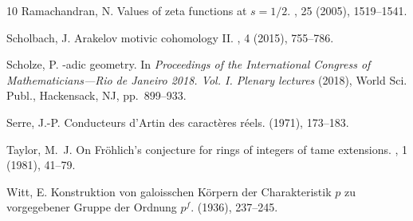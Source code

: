 \documentclass[12pt,leqno]{article}
\begin{document}
\begin{thebibliography}{10}
{\sc Ramachandran, N.}
\newblock Values of zeta functions at {$s=1/2$}.
, 25 (2005), 1519--1541.

{\sc Scholbach, J.}
\newblock Arakelov motivic cohomology {II}.
, 4 (2015), 755--786.

{\sc Scholze, P.}
-adic geometry.
\newblock In {\em Proceedings of the {I}nternational {C}ongress of
  {M}athematicians---{R}io de {J}aneiro 2018. {V}ol. {I}. {P}lenary lectures\/}
  (2018), World Sci. Publ., Hackensack, NJ, pp.~899--933.

{\sc Serre, J.-P.}
\newblock Conducteurs d'{A}rtin des caract\`eres r\'eels.
 (1971), 173--183.

{\sc Taylor, M.~J.}
\newblock On {F}r\"ohlich's conjecture for rings of integers of tame
  extensions.
, 1 (1981), 41--79.

{\sc Witt, E.}
\newblock Konstruktion von galoisschen {K}\"orpern der {C}harakteristik {$p$}
  zu vorgegebener {G}ruppe der {O}rdnung {$p^f$}.
 (1936), 237--245.

\end{thebibliography}

%
%
\end{document}
